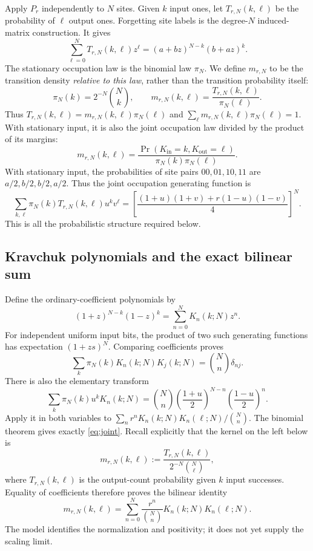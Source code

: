 \documentclass[11pt,reqno]{amsart}
\theoremstyle{remark}\newtheorem{remark}[theorem]{Remark}
\begin{document}
Apply $P_r$ independently to $N$ sites. Given $k$ input ones, let
$T_{r,N}(k,\ell)$ be the probability of $\ell$ output ones. Forgetting
site labels is the degree-$N$ induced-matrix construction. It gives
\begin{equation}\label{eq:transitionGF}
\sum_{\ell=0}^NT_{r,N}(k,\ell)z^\ell
=(a+bz)^{N-k}(b+az)^k.
\end{equation}
The stationary occupation law is the binomial law $\pi_N$. We define
$m_{r,N}$ to be the transition density \emph{relative to this law},
rather than the transition probability itself:
\begin{equation}\label{eq:density}
\pi_N(k)=2^{-N}\binom Nk,\qquad
m_{r,N}(k,\ell)=\frac{T_{r,N}(k,\ell)}{\pi_N(\ell)}.
\end{equation}
Thus $T_{r,N}(k,\ell)=m_{r,N}(k,\ell)\pi_N(\ell)$ and
$\sum_\ell m_{r,N}(k,\ell)\pi_N(\ell)=1$. With stationary input, it is
also the joint occupation law divided by the product of its margins:
\[
m_{r,N}(k,\ell)=
\frac{\Pr(K_{\mathrm{in}}=k,K_{\mathrm{out}}=\ell)}
{\pi_N(k)\pi_N(\ell)}.
\]
With stationary input, the probabilities of site pairs $00,01,10,11$
are $a/2,b/2,b/2,a/2$. Thus the joint occupation generating function is
\begin{equation}\label{eq:joint}
\sum_{k,\ell}\pi_N(k)T_{r,N}(k,\ell)u^kv^\ell
=\left[\frac{(1+u)(1+v)+r(1-u)(1-v)}4\right]^N.
\end{equation}
This is all the probabilistic structure required below.

\subsection{Kravchuk polynomials and the exact bilinear sum}
Define the ordinary-coefficient polynomials by
\begin{equation}\label{eq:Kdef}
(1+z)^{N-k}(1-z)^k=\sum_{n=0}^NK_n(k;N)z^n.
\end{equation}
For independent uniform input bits, the product of two such generating
functions has expectation $(1+zs)^N$. Comparing coefficients proves
\begin{equation}\label{eq:orthog}
\sum_k\pi_N(k)K_n(k;N)K_j(k;N)=\binom Nn\delta_{nj}.
\end{equation}
There is also the elementary transform
\[
\sum_k\pi_N(k)u^kK_n(k;N)
=\binom Nn\left(\frac{1+u}{2}\right)^{N-n}
\left(\frac{1-u}{2}\right)^n.
\]
Apply it in both variables to
$\sum_nr^nK_n(k;N)K_n(\ell;N)/\binom Nn$.
The binomial theorem gives exactly \eqref{eq:joint}.
Recall explicitly that the kernel on the left below is
\[
m_{r,N}(k,\ell):=\frac{T_{r,N}(k,\ell)}{2^{-N}\binom N\ell},
\]
where $T_{r,N}(k,\ell)$ is the output-count probability given $k$ input
successes. Equality of coefficients therefore proves the bilinear
identity
\begin{equation}\label{eq:finite-sum}
\boxed{\displaystyle
m_{r,N}(k,\ell)=\sum_{n=0}^N
\frac{r^n}{\binom Nn}K_n(k;N)K_n(\ell;N).}
\end{equation}
The model identifies the normalization and positivity; it does not yet
supply the scaling limit.
\end{document}
